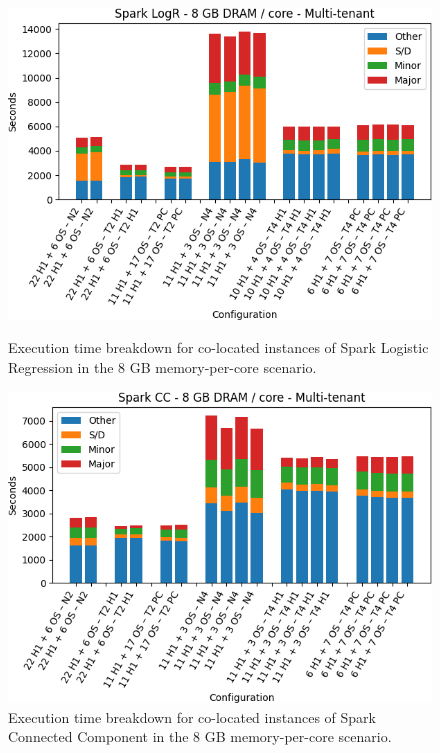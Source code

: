 \begin{figure}[thbp]
        \centering
    \includegraphics[width=\linewidth]{./fig/logr64.png}
    \caption{Execution time breakdown for co-located instances of Spark
    Logistic Regression in the 8 GB memory-per-core scenario.}
    \label{fig:logr64}

    \includegraphics[width=\linewidth]{./fig/cc64.png}
    \caption{Execution time breakdown for co-located instances of Spark
    Connected Component in the 8 GB memory-per-core scenario.}
    \label{fig:cc64}
\end{figure}


